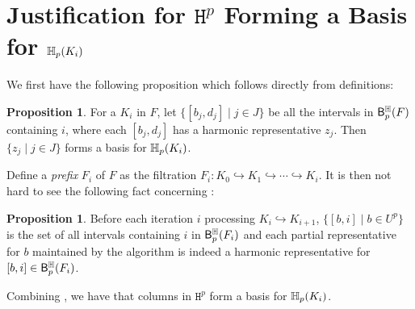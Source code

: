 \documentclass[10pt,a4paper]{amsart}
\newcommand {\mm}[1] {\ifmmode{#1}\else{\mbox{\(#1\)}}\fi}
\newcommand{\har}           {\mm{\mathbb{H}}}
\theoremstyle{definition}
\newcommand{\filt}{F}
\newcommand{\incto}{\hookrightarrow}
\newcommand{\hbarc}{\mathsf{B}^\har}
\newcommand{\Harmat}{\mathtt{H}}
\newtheorem{proposition}[theorem]{Proposition}
\theoremstyle{remark}
\begin{document}
\section{Justification for $\Harmat^p$ Forming a Basis for $\har_p(K_i)$}\label{sec:harmat-basis}

We first have the following proposition which follows directly from definitions:
\begin{proposition}\label{prop:har-rep-basis}
For a $K_i$ in $\filt$,
let $\{[b_j,d_j]\mid j\in J\}$ 
be all the intervals in $\hbarc_p(\filt)$ containing $i$,
where each $[b_j,d_j]$ has a harmonic representative $z_j$.
Then $\{z_j\mid j\in J\}$ forms a basis for $\har_p(K_i)$.
\end{proposition}

Define a \emph{prefix} $\filt_i$ of $\filt$ as the filtration
$\filt_i: 
K_0 \incto K_1 \incto
\cdots \incto K_i.$
It is then not hard to see the following fact concerning :
\begin{proposition}\label{prop:iter-unpair-to-i}
Before each iteration $i$
processing $K_{i}\incto K_{i+1}$,
$\{[b,i]\mid b\in U^p\}$
is the set of all intervals containing $i$
in $\hbarc_p(\filt_i)$
and each partial representative for $b$
maintained by the algorithm
is indeed a harmonic representative for $[b,i]\in \hbarc_p(\filt_i)$.
\end{proposition}

Combining ,
we have that columns in $\Harmat^p$ form a basis for $\har_p(K_i)$.
\end{document}
